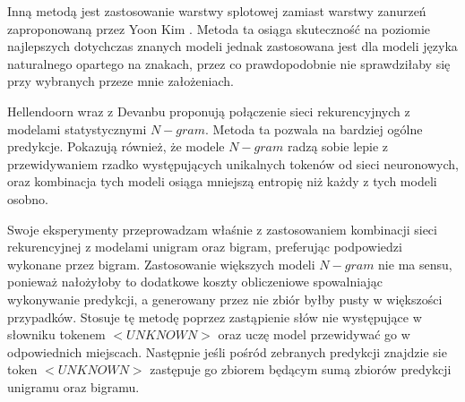 Inną metodą jest zastosowanie warstwy splotowej zamiast warstwy zanurzeń zaproponowaną przez Yoon Kim \cite{kim}. Metoda ta osiąga skuteczność 
na poziomie najlepszych dotychczas znanych modeli jednak zastosowana jest dla modeli języka naturalnego opartego na znakach, przez co 
prawdopodobnie nie sprawdziłaby się przy wybranych przeze mnie założeniach. 

Hellendoorn wraz z Devanbu \cite{hellendoorn} proponują połączenie sieci rekurencyjnych z modelami statystycznymi \begin{math}N-gram\end{math}. Metoda ta pozwala na bardziej 
ogólne predykcje. Pokazują również, że modele \begin{math}N-gram\end{math} radzą sobie lepie z przewidywaniem rzadko występujących unikalnych tokenów od sieci neuronowych, 
oraz kombinacja tych modeli osiąga mniejszą entropię niż każdy z tych modeli osobno. 

Swoje eksperymenty przeprowadzam właśnie z zastosowaniem kombinacji sieci rekurencyjnej z modelami unigram oraz bigram, preferując podpowiedzi wykonane przez bigram. Zastosowanie 
większych modeli \begin{math}N-gram\end{math} nie ma sensu, ponieważ nałożyłoby to dodatkowe koszty obliczeniowe spowalniając wykonywanie predykcji, a generowany przez nie zbiór 
byłby pusty w większości przypadków. 
Stosuje tę metodę poprzez zastąpienie słów nie występujące w słowniku tokenem \begin{math}<UNKNOWN>\end{math} oraz uczę model przewidywać go w odpowiednich miejscach. Następnie jeśli pośród 
zebranych predykcji znajdzie sie token \begin{math}<UNKNOWN>\end{math} zastępuje go zbiorem będącym sumą zbiorów predykcji unigramu oraz bigramu.  
